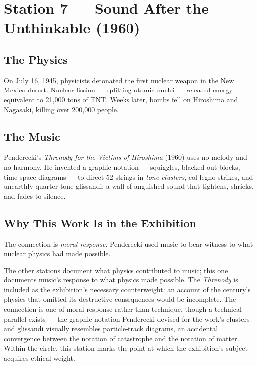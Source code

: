 \documentclass[11pt]{article}
\begin{document}
\section{Station 7 --- Sound After the Unthinkable (1960)}

\subsection{The Physics}
On July 16, 1945, physicists detonated the first nuclear weapon in the New Mexico desert.
Nuclear fission --- splitting atomic nuclei --- released energy equivalent to 21,000 tons of
TNT. Weeks later, bombs fell on Hiroshima and Nagasaki, killing over 200,000 people.

\subsection{The Music}
Penderecki's \emph{Threnody for the Victims of Hiroshima} (1960) uses no melody and no
harmony. He invented a graphic notation --- squiggles, blacked-out blocks, time-space
diagrams --- to direct 52 strings in \emph{tone clusters}, col legno strikes, and unearthly
quarter-tone glissandi: a wall of anguished sound that tightens, shrieks, and fades to
silence.

\subsection{Why This Work Is in the Exhibition}
The connection is \emph{moral response}. Penderecki used music to bear witness to what
nuclear physics had made possible.

The other stations document what physics contributed to music; this one documents music's
response to what physics made possible. The \emph{Threnody} is included as the exhibition's
necessary counterweight: an account of the century's physics that omitted its destructive
consequences would be incomplete. The connection is one of moral response rather than
technique, though a technical parallel exists --- the graphic notation Penderecki devised for
the work's clusters and glissandi visually resembles particle-track diagrams, an accidental
convergence between the notation of catastrophe and the notation of matter. Within the
circle, this station marks the point at which the exhibition's subject acquires ethical
weight.
\end{document}
